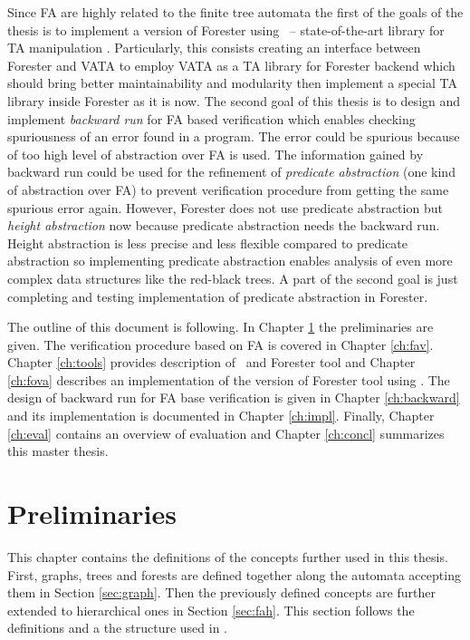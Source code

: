 Since FA are highly related to the finite tree automata the first of the goals of the thesis is to implement
a version of Forester using \vata\ -- state-of-the-art library for TA manipulation \cite{libvata}.
Particularly, this consists creating an interface between Forester and VATA to employ VATA as a TA library for Forester backend
which should bring better maintainability and modularity then implement a special TA library inside Forester as it is now.
The second goal of this thesis is to design and implement \emph{backward run} for FA based verification
which enables checking spuriousness of an error found in a program.
The error could be spurious because of too high level of abstraction over FA is used.
The information gained by backward run could be used for the refinement of \emph{predicate abstraction} (one kind of abstraction over FA)
to prevent verification procedure from getting the same spurious error again.
However, Forester does not use predicate abstraction but \emph{height abstraction} now
because predicate abstraction needs the backward run.
Height abstraction is less precise and less flexible compared to predicate abstraction so implementing predicate abstraction
enables analysis of even more complex data structures like the red-black trees.
A part of the second goal is just completing and testing implementation of predicate abstraction in Forester.

The outline of this document is following.
In Chapter \ref{ch:prel} the preliminaries are given.
The verification procedure based on FA is covered in Chapter \ref{ch:fav}.
Chapter \ref{ch:tools} provides description of \vata\ and Forester tool and Chapter \ref{ch:fova} describes an implementation of the version of Forester tool using \vata.
The design of backward run for FA base verification is given in Chapter \ref{ch:backward} and its implementation is documented
in Chapter \ref{ch:impl}.
Finally,
Chapter \ref{ch:eval} contains an overview of evaluation and 
Chapter \ref{ch:concl} summarizes this master thesis.

\chapter{Preliminaries}
\label{ch:prel}

This chapter contains the definitions of the concepts further used in this thesis.
First, graphs, trees and forests are defined together along the automata accepting them in Section \ref{sec:graph}.
Then the previously defined concepts are further extended to hierarchical ones in Section \ref{sec:fah}.
This section follows the definitions and a the structure used in \cite{techrep}.

